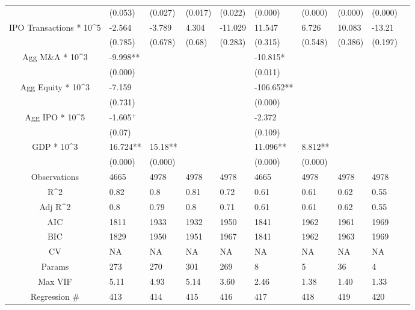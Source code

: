 \documentclass{article}
\begin{document}
\begin{table}[H]
\begin{tabular}{|clllllllll|}
   & (0.053) & (0.027) & (0.017) & (0.022) & (0.000) & (0.000) & (0.000) & (0.000) & \\
  IPO Transactions * 10^5 & -2.564 & -3.789 & 4.304 & -11.029 & 11.547 & 6.726 & 10.083 & -13.21 & \\
   & (0.785) & (0.678) & (0.68) & (0.283) & (0.315) & (0.548) & (0.386) & (0.197) & \\
  Agg M\&A * 10^3 & -9.998** &  &  &  & -10.815* &  &  &  & \\
   & (0.000) &  &  &  & (0.011) &  &  &  & \\
  Agg Equity * 10^3 & -7.159 &  &  &  & -106.652** &  &  &  & \\
   & (0.731) &  &  &  & (0.000) &  &  &  & \\
  Agg IPO * 10^5 & -1.605$^{+}$ &  &  &  & -2.372 &  &  &  & \\
   & (0.07) &  &  &  & (0.109) &  &  &  & \\
  GDP * 10^3 & 16.724** & 15.18** &  &  & 11.096** & 8.812** &  &  & \\
   & (0.000) & (0.000) &  &  & (0.000) & (0.000) &  &  & \\
  \hline
 Observations & 4665 & 4978 & 4978 & 4978 & 4665 & 4978 & 4978 & 4978 & \\
  R^2 & 0.82 & 0.8 & 0.81 & 0.72 & 0.61 & 0.61 & 0.62 & 0.55 & \\
  Adj R^2 & 0.8 & 0.79 & 0.8 & 0.71 & 0.61 & 0.61 & 0.62 & 0.55 & \\
  AIC & 1811 & 1933 & 1932 & 1950 & 1841 & 1962 & 1961 & 1969 & \\
  BIC & 1829 & 1950 & 1951 & 1967 & 1841 & 1962 & 1963 & 1969 & \\
  CV & NA & NA & NA & NA & NA & NA & NA & NA & \\
  Params & 273 & 270 & 301 & 269 & 8 & 5 & 36 & 4 & \\
  Max VIF & 5.11 & 4.93 & 5.14 & 3.60 & 2.46 & 1.38 & 1.40 & 1.33 & \\
  Regression \# & 413 & 414 & 415 & 416 & 417 & 418 & 419 & 420 & \\
   \hline
\end{tabular}

\end{table}
\end{document}
